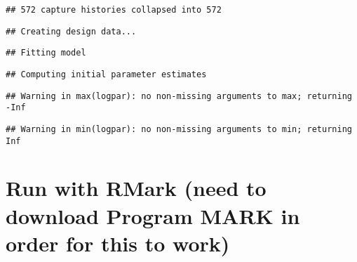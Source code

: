 \documentclass[]{article}
\newenvironment{Shaded}{\begin{snugshade}}{\end{snugshade}}
\newcommand{\KeywordTok}[1]{\textcolor[rgb]{0.13,0.29,0.53}{\textbf{#1}}}
\newcommand{\DataTypeTok}[1]{\textcolor[rgb]{0.13,0.29,0.53}{#1}}
\newcommand{\DecValTok}[1]{\textcolor[rgb]{0.00,0.00,0.81}{#1}}
\newcommand{\StringTok}[1]{\textcolor[rgb]{0.31,0.60,0.02}{#1}}
\newcommand{\CommentTok}[1]{\textcolor[rgb]{0.56,0.35,0.01}{\textit{#1}}}
\newcommand{\OtherTok}[1]{\textcolor[rgb]{0.56,0.35,0.01}{#1}}
\newcommand{\OperatorTok}[1]{\textcolor[rgb]{0.81,0.36,0.00}{\textbf{#1}}}
\newcommand{\NormalTok}[1]{#1}
\begin{document}
\begin{verbatim}
## 572 capture histories collapsed into 572
\end{verbatim}

\begin{verbatim}
## Creating design data...
\end{verbatim}

\begin{verbatim}
## Fitting model
\end{verbatim}

\begin{verbatim}
## Computing initial parameter estimates
\end{verbatim}

\begin{verbatim}
## Warning in max(logpar): no non-missing arguments to max; returning -Inf
\end{verbatim}

\begin{verbatim}
## Warning in min(logpar): no non-missing arguments to min; returning Inf
\end{verbatim}

\begin{Shaded}
\end{Shaded}

\section{Run with RMark (need to download Program MARK in order for this
to
work)}\label{run-with-rmark-need-to-download-program-mark-in-order-for-this-to-work}

\begin{Shaded}
\end{Shaded}
\end{document}
